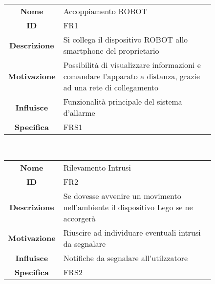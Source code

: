 \documentclass[]{article}
\begin{document}
\begin{figure}[htbp]
\centering
\begin{tabular}{|c|l|}
\hline

\textbf{Nome}
 & 
Accoppiamento ROBOT
\\

\textbf{ID}
 & 
FR1
\\

\textbf{Descrizione}
 & 
Si collega il dispositivo ROBOT allo smartphone del proprietario
\\

\textbf{Motivazione}
 & 
Possibilità di visualizzare informazioni e comandare l'apparato a
distanza, grazie ad una rete di collegamento
\\

\textbf{Influisce}
 & 
Funzionalità principale del sistema d'allarme
\\

\textbf{Specifica}
 & 
FRS1
\\
\hline
\end{tabular}
\end{figure}

~

\begin{figure}[htbp]
\centering
\begin{tabular}{|c|l|}
\hline

\textbf{Nome}
 & 
Rilevamento Intrusi
\\

\textbf{ID}
 & 
FR2
\\

\textbf{Descrizione}
 & 
Se dovesse avvenire un movimento nell'ambiente il dispositivo Lego se ne
accorgerà
\\

\textbf{Motivazione}
 & 
Riuscire ad individuare eventuali intrusi da segnalare
\\

\textbf{Influisce}
 & 
Notifiche da segnalare all'utilzzatore
\\

\textbf{Specifica}
 & 
FRS2
\\
\hline
\end{tabular}
\end{figure}

~
\end{document}
